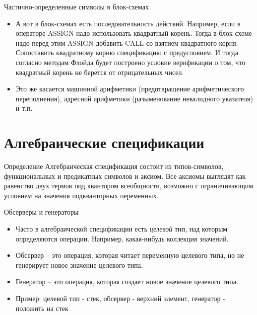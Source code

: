 \documentclass[hyperref={unicode=true}]{beamer}
\begin{document}
    \begin{frame}{Частично-определенные символы в блок-схемах}
    \begin{itemize}
    \item
    А вот в блок-схемах есть последовательность действий.
    Например, если в операторе ASSIGN надо использовать
    квадратный корень. Тогда в блок-схеме надо перед этим ASSIGN
    добавить CALL со взятием квадратного корня. Сопоставить
    квадратному корню спецификацию с предусловием. И тогда
    согласно методам Флойда будет построено условие верификации
    о том, что квадратный корень не берется от отрицательных чисел.
    \item
    Это же касается машинной арифметики (предотвращение арифметического
            переполнения), адресной арифметики (разыменование
                невалидного указателя) и т.п.
    \end{itemize}
    \end{frame}

    \section{Алгебраические спецификации}

    \begin{frame}{Определение}
    Алгебраическая спецификация состоит из
    типов-символов, функциональных и предикатных символов
    и аксиом. Все аксиомы выглядят как
    равенство двух термов под квантором всеобщности,
    возможно с ограничивающим условием на
    значения подкванторных переменных.
    \end{frame}

    \begin{frame}{Обсерверы и генераторы}
    \begin{itemize}
    \item
    Часто в алгебраической спецификации
    есть \emph{целевой} тип, над которым определяются
    операции. Например, какая-нибудь коллекция значений.
    \item
    Обсервер -- это операция, которая читает переменную
    целевого типа, но не генерирует новое значение
    целевого типа.
    \item
    Генератор -- это операция, которая создает новое
    значение целевого типа.
    \item
    Пример: целевой тип - стек, обсервер - верхний элемент,
    генератор - положить на стек
    \end{itemize}
    \end{frame}
\end{document}
